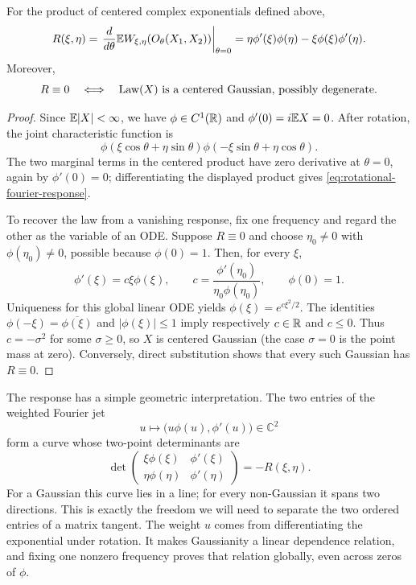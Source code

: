 \begin{lemma}
\label{lem:fourier-ode}
For the product of centered complex exponentials defined above,
\begin{equation}
 R(\xi,\eta)
 =\left.\frac{d}{d\theta}
       \mathbb E W_{\xi,\eta}(O_\theta(X_1,X_2))\right|_{\theta=0}
   =\eta\phi'(\xi)\phi(\eta)
          -\xi\phi(\xi)\phi'(\eta).
 \label{eq:rotational-fourier-response}
\end{equation}
Moreover,
\begin{equation}
 R\equiv0
 \quad\Longleftrightarrow\quad
 \operatorname{Law}(X)\text{ is a centered Gaussian, possibly degenerate}.
\end{equation}
\end{lemma}
\begin{proof}
Since $\mathbb E|X|<\infty$, we have $\phi\in C^1(\mathbb R)$ and
$\phi'(0)=i\mathbb E X=0$.  After rotation, the joint characteristic function is
\[
 \phi(\xi\cos\theta+\eta\sin\theta)
 \phi(-\xi\sin\theta+\eta\cos\theta).
\]
The two marginal terms in the centered product have zero derivative at
$\theta=0$, again by $\phi'(0)=0$; differentiating the displayed product
gives \eqref{eq:rotational-fourier-response}.

To recover the law from a vanishing response, fix one frequency and regard
the other as the variable of an ODE. Suppose $R\equiv0$ and choose $\eta_0\ne0$ with
$\phi(\eta_0)\ne0$, possible because $\phi(0)=1$.  Then, for every $\xi$,
\[
 \phi'(\xi)=c\xi\phi(\xi),\qquad
 c=\frac{\phi'(\eta_0)}{\eta_0\phi(\eta_0)},\qquad
 \phi(0)=1.
\]
Uniqueness for this global linear ODE yields
$\phi(\xi)=e^{c\xi^2/2}$.  The identities
$\phi(-\xi)=\overline{\phi(\xi)}$ and $|\phi(\xi)|\le1$ imply respectively
$c\in\mathbb R$ and $c\le0$.  Thus $c=-\sigma^2$ for some $\sigma\ge0$, so $X$ is
centered Gaussian (the case $\sigma=0$ is the point mass at zero).
Conversely, direct substitution shows that every such Gaussian has
$R\equiv0$.
\end{proof}

The response has a simple geometric interpretation. The two entries of the
weighted Fourier jet
\[
 u\longmapsto\bigl(u\phi(u),\phi'(u)\bigr)\in\mathbb C^2
\]
form a curve whose two-point determinants are
\begin{equation}
 \det\!\begin{pmatrix}
 \xi\phi(\xi)&\phi'(\xi)\\
 \eta\phi(\eta)&\phi'(\eta)
 \end{pmatrix}
 =-R(\xi,\eta).
\end{equation}
For a Gaussian this curve lies in a line; for every non-Gaussian it spans
two directions. This is exactly the freedom we will need to separate the
two ordered entries of a matrix tangent. The weight \(u\) comes from
differentiating the exponential under rotation. It makes Gaussianity a
linear dependence relation, and fixing one nonzero frequency proves that
relation globally, even across zeros of \(\phi\).

